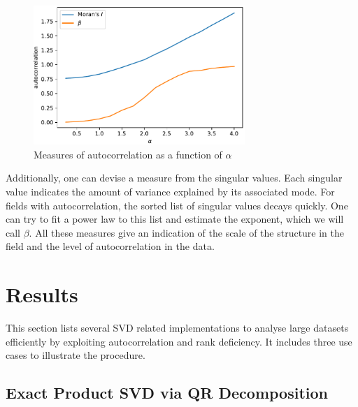 \documentclass[ijgi,article,submit,moreauthors,pdftex,10pt,a4paper]{Definitions/mdpi}
\begin{document}
\begin{figure}[H]
\centering
\includegraphics[width=80mm]{Results/plotMoransIAndBeta.pdf}
\caption[Various measures of autocorrelation]{Measures of autocorrelation as a function of $\alpha$}
\label{fig:plotGammaAndMoransIAndBeta}
\end{figure}

Additionally, one can devise a measure from the singular values. Each singular value indicates the amount of variance explained by its associated mode. For fields with autocorrelation, the sorted list of singular values decays quickly. One can try to fit a power law to this list and estimate the exponent, which we will call $\beta$. All these measures give an indication of the scale of the structure in the field and the level of autocorrelation in the data.

\section{Results}


This section lists several SVD related implementations to analyse large datasets efficiently by exploiting autocorrelation and rank deficiency. It includes three use cases to illustrate the procedure.

\subsection{Exact Product SVD via QR Decomposition}
\label{sec:Results/Exact Product SVD via QR Decomposition}
\end{document}
